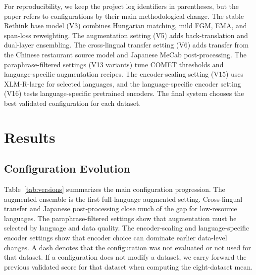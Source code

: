 \documentclass[runningheads]{llncs}
\begin{document}
For reproducibility, we keep the project log identifiers in
parentheses, but the paper refers to configurations by their main
methodological change. The stable Rethink base model (V3) combines
Hungarian matching, mild FGM, EMA, and span-loss reweighting. The
augmentation setting (V5) adds back-translation and dual-layer
ensembling. The cross-lingual transfer setting (V6) adds transfer from
the Chinese restaurant source model and Japanese MeCab post-processing.
The paraphrase-filtered settings (V13 variants) tune COMET thresholds
and language-specific augmentation recipes. The encoder-scaling setting
(V15) uses XLM-R-large for selected languages, and the language-specific
encoder setting (V16) tests language-specific pretrained encoders. The
final system chooses the best validated configuration for each dataset.

\section{Results}

\subsection{Configuration Evolution}

Table~\ref{tab:versions} summarizes the main configuration progression.
The augmented ensemble is the first full-language augmented setting.
Cross-lingual transfer and Japanese post-processing close much of the
gap for low-resource languages. The paraphrase-filtered settings show
that augmentation must be selected by language and data quality. The
encoder-scaling and language-specific encoder settings show that
encoder choice can dominate earlier data-level changes. A dash denotes
that the configuration was not evaluated or not used for that dataset.
If a configuration does not modify a dataset, we carry forward the
previous validated score for that dataset when computing the
eight-dataset mean.
\end{document}
